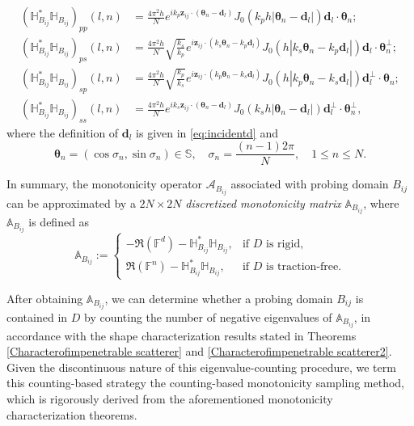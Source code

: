 \documentclass[11pt,reqno,twoside]{amsart}
\theoremstyle{definition}
\theoremstyle{remark}
\numberwithin{equation}{section}
\begin{document}
\begin{align*}
    \left(\mathbb{H}_{ B_{ij}}^* \mathbb{H}_{ B_{ij}} \right)_{pp}(l,n) &=\frac{4\pi^2 h}{N} e^{i k_p \mathbf z_{ij} \cdot (\bm\theta_n - \mathbf d_l)} J_0\left( k_p h |\bm\theta_n - \mathbf d_l| \right) \mathbf d_l \cdot \bm\theta_n;\\
    \left(\mathbb{H}_{ B_{ij}}^* \mathbb{H}_{ B_{ij}} \right)_{ps}(l,n) &=\frac{4\pi^2 h}{N} \sqrt{\frac{k_s}{k_p}} e^{i \mathbf z_{ij} \cdot (k_s \bm\theta_n - k_p \mathbf d_l)} J_0\left( h |k_s \bm\theta_n - k_p \mathbf d_l| \right) \mathbf d_l \cdot \bm\theta_n^\perp;\\
    \left(\mathbb{H}_{ B_{ij}}^* \mathbb{H}_{ B_{ij}} \right)_{sp}(l,n) &=\frac{4\pi^2 h}{N} \sqrt{\frac{k_p}{k_s}} e^{i \mathbf z_{ij} \cdot (k_p \bm\theta_n - k_s \mathbf d_l)} J_0\left( h |k_p \bm\theta_n - k_s \mathbf d_l| \right) \mathbf d_l^\perp \cdot \bm\theta_n;\\
    \left(\mathbb{H}_{ B_{ij}}^* \mathbb{H}_{ B_{ij}} \right)_{ss}(l,n) &=\frac{4\pi^2 h}{N} e^{i k_s \mathbf z_{ij} \cdot (\bm\theta_n - \mathbf d_l)} J_0\left( k_s h |\bm\theta_n - \mathbf d_l| \right) \mathbf d_l^\perp \cdot \bm\theta_n^\perp,
\end{align*}
where the definition of \(\mathbf d_l\) is given in \eqref{eq:incidentd} and
\[
\bm\theta_n = \left( \cos \sigma_n, \sin \sigma_n \right) \in \mathbb S, \quad \sigma_n = \frac{(n-1)2\pi}{N}, \quad 1 \leq n \leq N.
\]

In summary, the monotonicity operator $\mathcal A_{B_{ij}}$ associated with probing domain \(B_{ij}\) can be approximated by a $2N \times 2N$ \emph{discretized monotonicity matrix} $\mathbb A_{B_{ij}}$, where $\mathbb A_{B_{ij}}$ is defined as
\begin{equation}\label{discretized operator:A_B}
\mathbb A_{B_{ij}} :=
\begin{cases}
-\Re(\mathbb{F}^d) - \mathbb{H}_{B_{ij}}^* \mathbb{H}_{B_{ij}}, & 	\text{if $D$ is rigid}, \\
\Re(\mathbb{F}^n) - \mathbb{H}_{B_{ij}}^* \mathbb{H}_{B_{ij}}, & 	\text{if $D$ is traction-free}.
\end{cases}
\end{equation}


After obtaining $\mathbb A_{B_{ij}}$, we can determine whether a probing domain $ B_{ij} $ is contained in $ D $ by counting the number of negative eigenvalues of $\mathbb A_{B_{ij}}$, in accordance with the shape characterization results stated in Theorems \ref{Characterofimpenetrable scatterer} and \ref{Characterofimpenetrable scatterer2}. Given the discontinuous nature of this eigenvalue-counting procedure, we term this counting-based strategy the counting-based monotonicity sampling method, which is rigorously derived from the aforementioned monotonicity characterization theorems.
\end{document}
